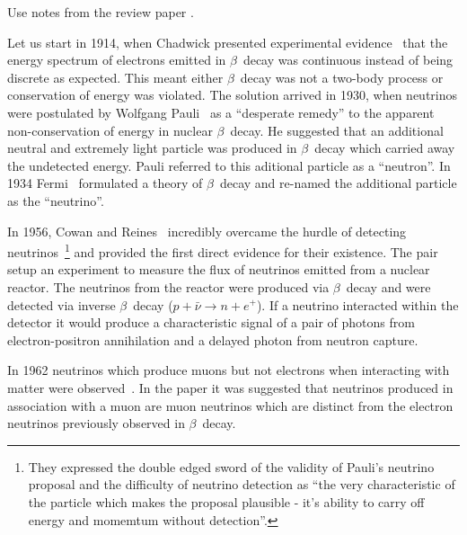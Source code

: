 Use notes from the review paper \cite{LBNReview_Rubbia}.

Let us start in 1914, when Chadwick presented experimental
evidence~\cite{chadwick1914distribution} that the energy spectrum of
electrons emitted in $\beta$~decay was continuous instead of being
discrete as expected. This meant either $\beta$~decay was not a
two-body process or conservation of energy was violated.   
The solution arrived in 1930, when neutrinos were postulated by
Wolfgang Pauli~\cite{pauli1930letter} as a ``desperate remedy'' to the
apparent non-conservation of energy in nuclear $\beta$~decay. He
suggested that an additional neutral and extremely light
particle was produced in $\beta$~decay which carried away
the undetected energy.  
Pauli referred to this aditional particle as a ``neutron''. In 1934
Fermi~\cite{fermi1934tentativo} formulated a theory of $\beta$~decay
and re-named the additional particle as the ``neutrino''.

In 1956, Cowan and Reines~\cite{Reines:1956rs} incredibly overcame the
hurdle of detecting neutrinos~\footnote{They expressed the
  double edged sword of the validity of Pauli's neutrino proposal and
  the difficulty of neutrino detection as “the very characteristic of
  the particle which makes the proposal plausible - it’s ability to
  carry off energy and momemtum without detection”.} 
and provided the first
direct evidence for their existence. The pair setup an experiment to
measure the flux of neutrinos emitted from a nuclear reactor. The
neutrinos from the reactor were produced via $\beta$~decay and were
detected via inverse $\beta$~decay ($p + \bar{\nu} \rightarrow n +
e^+$). If a neutrino interacted within the detector it would produce a
characteristic signal of a pair of photons from electron-positron
annihilation and a delayed photon from neutron capture.

In 1962 neutrinos which produce muons but not electrons when
interacting with matter were
observed~\cite{MuonNeutrino:PhysRevLett.9.36}. In the paper it was
suggested that neutrinos produced in association
with a muon are muon neutrinos which are distinct
from the electron neutrinos previously observed in $\beta$~decay. 



